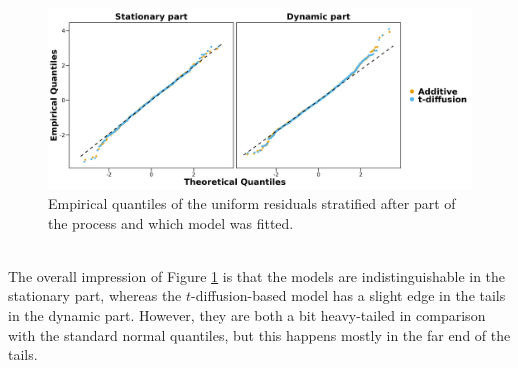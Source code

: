 \begin{figure}[h!]
\begin{center}
    \includegraphics[scale = .1]{figures/OU_vs_t_diffusion_QQ_plot.jpeg}
    \caption{Empirical quantiles of the uniform residuals stratified after part of the process and which model was fitted.}
    \label{figure:OU_t_diffusion_QQ_plot}
\end{center}
\end{figure}\\
The overall impression of Figure \ref{figure:OU_t_diffusion_QQ_plot} is that the models are indistinguishable in the stationary part, whereas the $t$-diffusion-based model has a slight edge in the tails in the dynamic part. However, they are both a bit heavy-tailed in comparison with the standard normal quantiles, but this happens mostly in the far end of the tails. 

